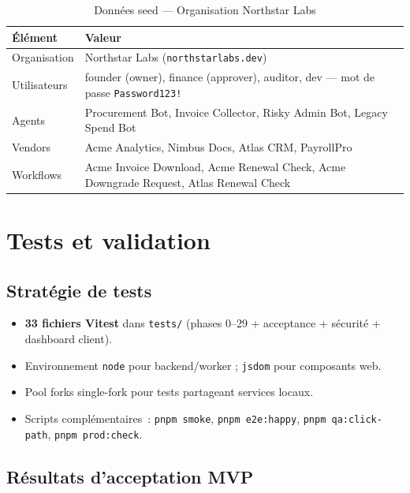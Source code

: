 \begin{table}[H]
\centering
\caption{Données seed — Organisation Northstar Labs}
\label{tab:seed}
\small
\begin{tabularx}{\textwidth}{@{}lX@{}}
\toprule
\textbf{Élément} & \textbf{Valeur} \\
\midrule
\rowcolor{rowgray}
Organisation & Northstar Labs (\texttt{northstarlabs.dev}) \\
Utilisateurs & founder (owner), finance (approver), auditor, dev
  — mot de passe \texttt{Password123!} \\
\rowcolor{rowgray}
Agents & Procurement Bot, Invoice Collector, Risky Admin Bot,
  Legacy Spend Bot \\
Vendors & Acme Analytics, Nimbus Docs, Atlas CRM, PayrollPro \\
\rowcolor{rowgray}
Workflows & Acme Invoice Download, Acme Renewal Check,
  Acme Downgrade Request, Atlas Renewal Check \\
\bottomrule
\end{tabularx}
\end{table}

\section{Tests et validation}

\subsection{Stratégie de tests}

\begin{itemize}[leftmargin=1.8cm, itemsep=3pt]
  \item \textbf{33 fichiers Vitest} dans \texttt{tests/} (phases 0--29 +
    acceptance + sécurité + dashboard client).
  \item Environnement \texttt{node} pour backend/worker ;
    \texttt{jsdom} pour composants web.
  \item Pool forks single-fork pour tests partageant services locaux.
  \item Scripts complémentaires~: \texttt{pnpm smoke}, \texttt{pnpm e2e:happy},
    \texttt{pnpm qa:click-path}, \texttt{pnpm prod:check}.
\end{itemize}

\subsection{Résultats d'acceptation MVP}

